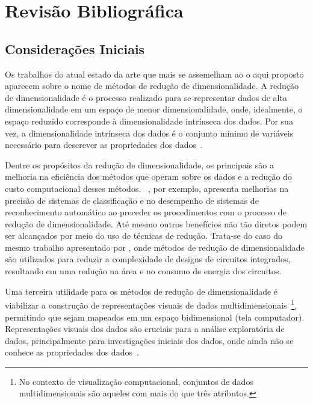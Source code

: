 \chapter{Revisão Bibliográfica}\label{chap:revisao}

\section{Considerações Iniciais}


Os trabalhos do atual estado da arte que mais se assemelham ao o aqui proposto aparecem sobre o nome de métodos de redução de dimensionalidade. 
A redução de dimensionalidade é o processo realizado para se representar dados de alta dimensionalidade em um espaço de menor dimensionalidade, onde, idealmente, o espaço reduzido corresponde à dimensionalidade intrínseca dos dados. 
Por sua vez, a dimensionalidade intrínseca dos dados é o conjunto mínimo de variáveis necessário para descrever as propriedades dos dados~\cite{Fukunaga1990}.

Dentre os propósitos da redução de dimensionalidade, os principais são a melhoria na eficiência dos métodos que operam sobre os dados e a redução do custo computacional desses métodos.  
\citeauthor{Konig2000}~\cite{Konig2000}, por exemplo, apresenta melhorias na precisão de sistemas de classificação e no desempenho de sistemas de reconhecimento automático ao preceder os procedimentos com o processo de redução de dimensionalidade. 
Até mesmo outros benefícios não tão diretos podem ser alcançados por meio do uso de técnicas de redução. 
Trata-se do caso do mesmo trabalho apresentado por \citeauthor{Konig2000}, onde métodos de redução de dimensionalidade são utilizados para reduzir a complexidade de designs de circuitos integrados, resultando em uma redução na área e no consumo de energia dos circuitos.

Uma terceira utilidade para os métodos de redução de dimensionalidade é viabilizar a construção de representações visuais de dados multidimensionais~\footnote{No contexto de visualização computacional, conjuntos de dados multidimensionais são aqueles com mais do que três atributos.}, permitindo que sejam mapeados em um espaço bidimensional (tela computador).
Representações visuais dos dados são cruciais para a análise exploratória de dados, principalmente para investigações iniciais dos dados, onde ainda não se conhece as propriedades dos dados~\cite{Kaski2011}. 

